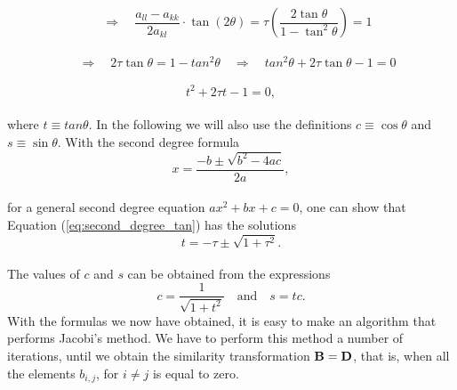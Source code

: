 \documentclass[12pt]{article}
\begin{document}
\begin{flushleft}
$$\quad\Rightarrow\quad \frac{a_{ll}-a_{kk}}{2a_{kl}}\cdot\tan(2\theta) = \tau\left(\frac{2\tan\theta}{1-\tan^2\theta}\right) = 1$$\\
\vspace{5mm}
$$\quad\Rightarrow\quad 2\tau\tan\theta = 1-tan^2\theta \quad\Rightarrow\quad tan^2\theta + 2\tau\tan\theta -1 = 0$$\\
\begin{equation}\label{eq:second_degree_tan}
t^2 + 2\tau t - 1 = 0,
\end{equation}\\
\vspace{5mm}
where $t\equiv tan\theta$. In the following we will also use the definitions $c\equiv \cos\theta$ and $s\equiv \sin\theta$. 
\newpage
With the second degree formula\\
\vspace{5mm}
$$x = \frac{-b\pm\sqrt{b^2-4ac}}{2a},$$\\
\vspace{5mm}
for a general second degree equation $ax^2 + bx + c = 0$, one can show that Equation (\ref{eq:second_degree_tan}) has the solutions\\
\vspace{5mm}
\begin{equation}\label{eq:tan}
t = -\tau \pm\sqrt{1+\tau^2}.
\end{equation}\\
\vspace{5mm}
The values of $c$ and $s$ can be obtained from the expressions\\
\vspace{5mm}
\begin{equation}\label{eq:sin_cos}
c = \frac{1}{\sqrt{1+t^2}} \quad\text{and}\quad s=tc.
\end{equation}
\vspace{5mm}
With the formulas we now have obtained, it is easy to make an algorithm that performs Jacobi's method. We have to perform this method a number of iterations, until we obtain the similarity transformation $\bf B = D$, that is, when all the elements $b_{i,j}$, for $ i\neq j$ is equal to zero.\\

\end{flushleft}
\end{document}
